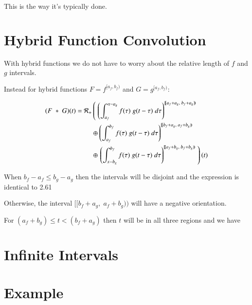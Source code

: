This is the way it's typically done.

\section{Hybrid Function Convolution}

With hybrid functions we do not have to worry about the relative length of $f$ and $g$ intervals.

Instead for hybrid functions $F = f^{[a_f, b_f)}$ and $G = g^{[a_f, b_f)}$:

\begin{align}
	(F \;*\; G) (t) = 
		\mathcal{R}_+ &\left( \; \left( 
			\int_{a_f}^{x-a_g} f(\tau) \; g(t-\tau) \; d\tau \right)^{[\![a_f+a_g,\; b_f+a_g)\!)} 
				\right. \notag \\ &\oplus \left( 
			\int_{a_f}^{b_f} f(\tau) \; g(t-\tau) \; d\tau \right)^{[\![b_f+a_g,\; a_f+b_g)\!)} 
				\notag \\ &\oplus \left. \left( 
			\int_{x-b_g}^{b_f} f(\tau) \; g(t-\tau) \; d\tau \right)^{[\![a_f+b_g,\; b_f+b_g)\!)} 
				\; \right)(t)
\end{align}

When $b_f - a_f \leq b_g - a_g$ then the intervals will be disjoint and the expression is identical to 2.61

Otherwise, the interval $[\![b_f +a_g, \; a_f + b_g)\!)$ will have a negative orientation.

For $(a_f+b_g) \leq t < (b_f+a_g)$ then $t$ will be in all three regions and we have


\section{Infinite Intervals}


\section{Example}

\newpage